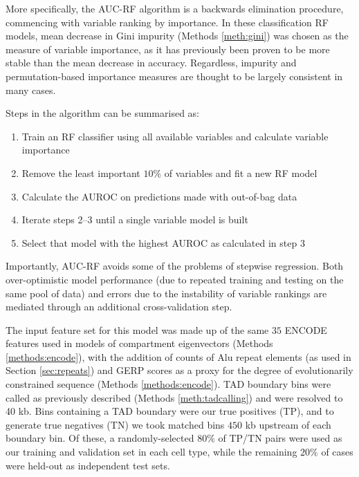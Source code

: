 \documentclass[a4paper,11pt,oneside]{book}
\begin{document}
More specifically, the AUC-RF algorithm is a backwards elimination procedure, commencing with variable ranking by importance. In these classification RF models, mean decrease in Gini impurity (Methods \ref{meth:gini}) was chosen as the measure of variable importance, as it has previously been proven to be more stable than the mean decrease in accuracy.\cite{Calle2011} Regardless, impurity and permutation-based importance measures are thought to be largely consistent in many cases.\cite{Liaw2002, Hastie2001}

Steps in the algorithm can be summarised as:\cite{Calle2011}
\begin{enumerate}
\item Train an RF classifier using all available variables and calculate variable importance
\item Remove the least important $10\%$ of variables and fit a new RF model
\item Calculate the AUROC on predictions made with out-of-bag data
\item Iterate steps 2--3 until a single variable model is built
\item Select that model with the highest AUROC as calculated in step 3
\end{enumerate} \vspace{.1em}

Importantly, AUC-RF avoids some of the problems of stepwise regression. Both over-optimistic model performance (due to repeated training and testing on the same pool of data) and errors due to the instability of variable rankings are mediated through an additional cross-validation step.\cite{Calle2011}

The input feature set for this model was made up of the same $35$ ENCODE features used in models of compartment eigenvectors (Methods \ref{methods:encode}), with the addition of counts of Alu repeat elements (as used in Section \ref{sec:repeats}) and GERP scores as a proxy for  the degree of evolutionarily constrained sequence (Methods \ref{methods:encode}). TAD boundary bins were called as previously described (Methods \ref{meth:tadcalling}) and were resolved to 40 kb. Bins containing a TAD boundary were our true positives (TP), and to generate true negatives (TN) we took matched bins $450$ kb upstream of each boundary bin. Of these, a randomly-selected $80\%$ of TP/TN pairs were used as our training and validation set in each cell type, while the remaining $20\%$ of cases were held-out as independent test sets.
\end{document}
